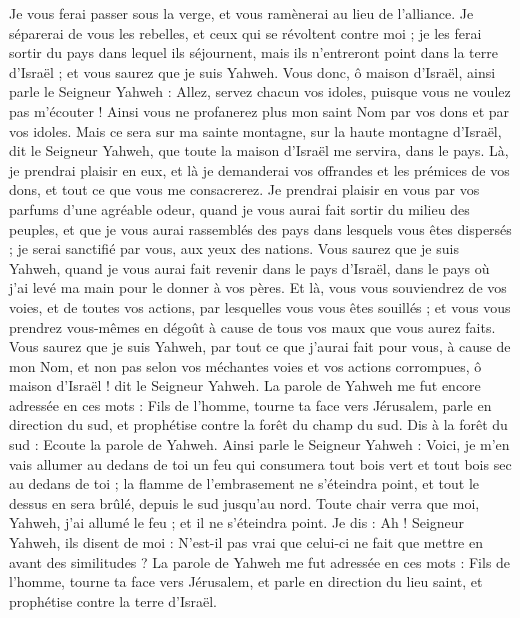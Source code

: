 \begin{multicols}{2}
Je vous ferai passer sous la verge, et vous ramènerai au lieu de l'alliance.
Je séparerai de vous les rebelles, et ceux qui se révoltent contre moi ; je les ferai sortir du pays dans lequel ils séjournent, mais ils n'entreront point dans la terre d'Israël ; et vous saurez que je suis Yahweh.
Vous donc, ô maison d'Israël, ainsi parle le Seigneur Yahweh : Allez, servez chacun vos idoles, puisque vous ne voulez pas m’écouter ! Ainsi vous ne profanerez plus mon saint Nom par vos dons et par vos idoles.
Mais ce sera sur ma sainte montagne, sur la haute montagne d'Israël, dit le Seigneur Yahweh, que toute la maison d'Israël me servira, dans le pays. Là, je prendrai plaisir en eux, et là je demanderai vos offrandes et les prémices de vos dons, et tout ce que vous me consacrerez.
Je prendrai plaisir en vous par vos parfums d’une agréable odeur, quand je vous aurai fait sortir du milieu des peuples, et que je vous aurai rassemblés des pays dans lesquels vous êtes dispersés ; je serai sanctifié par vous, aux yeux des nations.
Vous saurez que je suis Yahweh, quand je vous aurai fait revenir dans le pays d'Israël, dans le pays où j'ai levé ma main pour le donner à vos pères.
Et là, vous vous souviendrez de vos voies, et de toutes vos actions, par lesquelles vous vous êtes souillés ; et vous vous prendrez vous-mêmes en dégoût à cause de tous vos maux que vous aurez faits.
Vous saurez que je suis Yahweh, par tout ce que j'aurai fait pour vous, à cause de mon Nom, et non pas selon vos méchantes voies et vos actions corrompues, ô maison d'Israël ! dit le Seigneur Yahweh.
\VerseOne{}La parole de Yahweh me fut encore adressée en ces mots :
Fils de l’homme, tourne ta face vers Jérusalem, parle en direction du sud, et prophétise contre la forêt du champ du sud.
Dis à la forêt du sud : Ecoute la parole de Yahweh. Ainsi parle le Seigneur Yahweh : Voici, je m'en vais allumer au dedans de toi un feu qui consumera tout bois vert et tout bois sec au dedans de toi ; la flamme de l'embrasement ne s'éteindra point, et tout le dessus en sera brûlé, depuis le sud jusqu'au nord.
Toute chair verra que moi, Yahweh, j'ai allumé le feu ; et il ne s'éteindra point.
Je dis : Ah ! Seigneur Yahweh, ils disent de moi : N'est-il pas vrai que celui-ci ne fait que mettre en avant des similitudes ?
La parole de Yahweh me fut adressée en ces mots :
Fils de l’homme, tourne ta face vers Jérusalem, et parle en direction du lieu saint, et prophétise contre la terre d'Israël.

\end{multicols}
